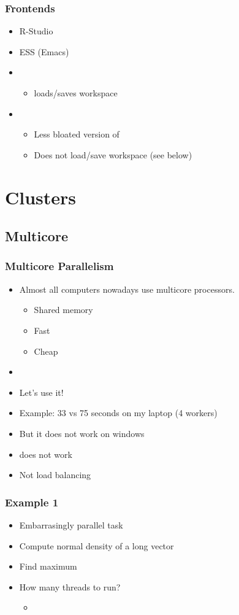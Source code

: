 \documentclass[pdftex]{beamer}
\begin{document}
\begin{frame}
  \frametitle{Frontends}
  \begin{itemize}
  \item R-Studio
  \item ESS (Emacs)
  \item {}
    \begin{itemize}
    \item loads/saves workspace
    \end{itemize}
  \item {}
    \begin{itemize}
    \item Less bloated version of 
    \item Does not load/save workspace (see below)
    \end{itemize}
  \end{itemize}
\end{frame}

\section{Clusters}
\subsection{Multicore}

\begin{frame}
  \frametitle{Multicore Parallelism}
  \begin{itemize}
  \item Almost all computers nowadays use multicore processors.
    \begin{itemize}
    \item Shared memory
    \item Fast
    \item Cheap
    \end{itemize}
  \item {}
  \item Let's use it!
  \item Example: 33 vs 75 seconds on my laptop (4 workers)
    \pause
  \item But it does not work on windows \frownie{}
  \item {} does not work
  \item Not load balancing
  \end{itemize}
\end{frame}

\begin{frame}
  \frametitle{Example 1}
  \begin{itemize}
  \item Embarrasingly parallel task
  \item Compute normal density of a long vector
  \item Find maximum
  \item How many threads to run?
    \begin{itemize}
    \item {}
    \end{itemize}
  \end{itemize}
\end{frame}
\end{document}

